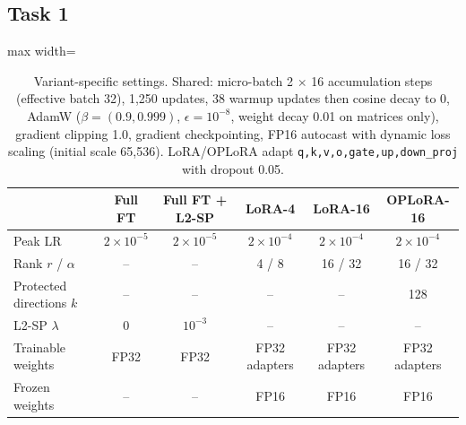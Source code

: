 \documentclass{article}
\begin{document}
\subsection{Task 1}
\begin{table}[h]\centering\small
\begin{adjustbox}{max width=\linewidth}\begin{tabular}{lccccc}\toprule
 & Full FT & Full FT + L2-SP & LoRA-4 & LoRA-16 & OPLoRA-16 \\\midrule
Peak LR & $2\times10^{-5}$ & $2\times10^{-5}$ & $2\times10^{-4}$ & $2\times10^{-4}$ & $2\times10^{-4}$ \\
Rank $r$ / $\alpha$ & -- & -- & 4 / 8 & 16 / 32 & 16 / 32 \\
Protected directions $k$ & -- & -- & -- & -- & 128 \\
L2-SP $\lambda$ & 0 & $10^{-3}$ & -- & -- & -- \\
Trainable weights & FP32 & FP32 & FP32 adapters & FP32 adapters & FP32 adapters \\
Frozen weights & -- & -- & FP16 & FP16 & FP16 \\\bottomrule
\end{tabular}\end{adjustbox}
\caption{Variant-specific settings. Shared: micro-batch 2 $\times$ 16 accumulation steps (effective batch 32), 1{,}250 updates, 38 warmup updates then cosine decay to 0, AdamW ($\beta=(0.9,0.999)$, $\epsilon=10^{-8}$, weight decay 0.01 on matrices only), gradient clipping 1.0, gradient checkpointing, FP16 autocast with dynamic loss scaling (initial scale 65{,}536). LoRA/OPLoRA adapt \texttt{q,k,v,o,gate,up,down\_proj} with dropout 0.05.}
\end{table}
\end{document}

